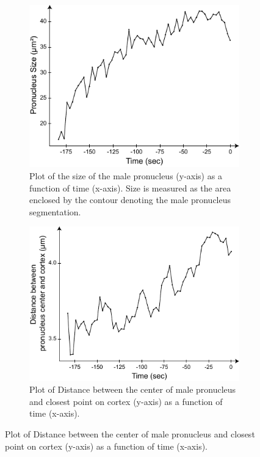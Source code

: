\begin{figure}[h]
\begin{subfigure}[t]{0.45\textwidth}
    \centering
    \includegraphics[width=\textwidth]{ExpMethods/FigTrackNucleus/sizeVsTime.pdf}
    \caption{Plot of the size of the male pronucleus (y-axis) as a function of time (x-axis). Size is measured as the area enclosed by the contour denoting the male pronucleus segmentation.} 
    \label{subfig:malePronucleusTrackingResults-sizeVsTime}
\end{subfigure}
\hfill
\begin{subfigure}[t]{0.45\textwidth}
    \centering
    \includegraphics[width=\textwidth]{ExpMethods/FigTrackNucleus/crtxDistVsTime.pdf}
    \caption{Plot of Distance between the center of male pronucleus and closest point on cortex (y-axis) as a function of time (x-axis).} 
    \label{subfig:malePronucleusTrackingResults-crtxDistVsTime}
\end{subfigure}


\end{figure}
